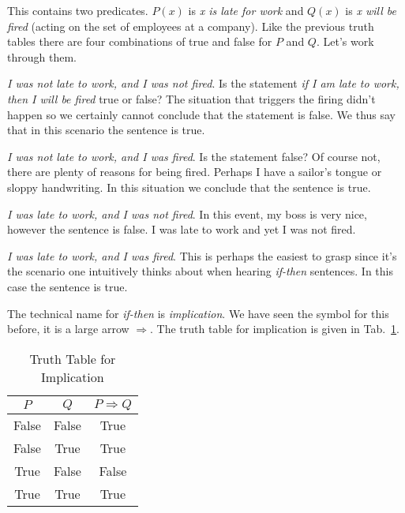             This contains two predicates. $P(x)$ is \textit{x is late for work}
            and $Q(x)$ is \textit{x will be fired} (acting on the set of
            employees at a company). Like the previous truth tables there are
            four combinations of true and false for $P$ and $Q$. Let's work
            through them.
            \par\hfill\par
            \textit{I was not late to work, and I was not fired}. Is the
            statement \textit{if I am late to work, then I will be fired}
            true or false? The situation that triggers the firing didn't happen
            so we certainly cannot conclude that the statement is false. We
            thus say that in this scenario the sentence is true.
            \par\hfill\par
            \textit{I was not late to work, and I was fired}. Is the statement
            false? Of course not, there are plenty of reasons for being fired.
            Perhaps I have a sailor's tongue or sloppy handwriting. In this
            situation we conclude that the sentence is true.
            \par\hfill\par
            \textit{I was late to work, and I was not fired}. In this event, my
            boss is very nice, however the sentence is false. I was late to work
            and yet I was not fired.
            \par\hfill\par
            \textit{I was late to work, and I was fired}. This is perhaps the
            easiest to grasp since it's the scenario one intuitively thinks
            about when hearing \textit{if-then} sentences. In this case the
            sentence is true.
            \par\hfill\par
            The technical name for \textit{if-then} is \textit{implication}. We
            have seen the symbol for this before, it is a large arrow
            $\Rightarrow$. The truth table for implication is given in
            Tab.~\ref{tab:truth_table_implication}.
            \begin{table}
                \centering
                \begin{tabular}{c | c | c}
                    $P$&$Q$&$P\Rightarrow{Q}$\\
                    \hline
                    False&False&True\\
                    \hline
                    False&True&True\\
                    \hline
                    True&False&False\\
                    \hline
                    True&True&True
                \end{tabular}
                \caption{Truth Table for Implication}
                \label{tab:truth_table_implication}
            \end{table}
